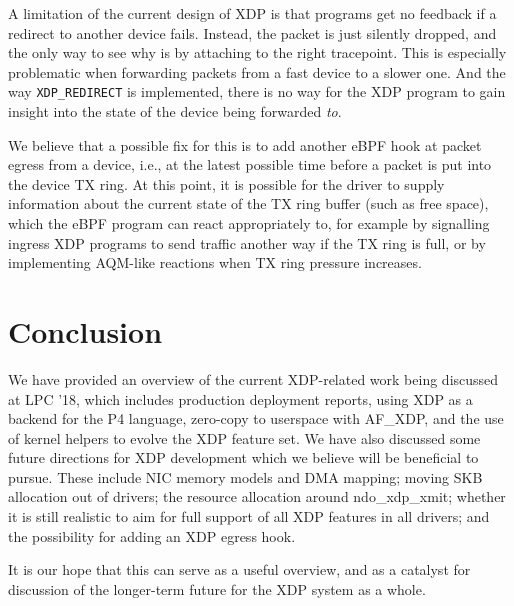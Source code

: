 \documentclass[sigconf]{acmart}
\begin{document}
A limitation of the current design of XDP is that programs get no feedback if a
redirect to another device fails. Instead, the packet is just silently dropped,
and the only way to see why is by attaching to the right tracepoint. This is
especially problematic when forwarding packets from a fast device to a slower
one. And the way \texttt{XDP\_REDIRECT} is implemented, there is no way for the
XDP program to gain insight into the state of the device being forwarded
\emph{to}.

We believe that a possible fix for this is to add another eBPF hook at packet
egress from a device, i.e., at the latest possible time before a packet is put
into the device TX ring. At this point, it is possible for the driver to supply
information about the current state of the TX ring buffer (such as free space),
which the eBPF program can react appropriately to, for example by signalling
ingress XDP programs to send traffic another way if the TX ring is full, or by
implementing AQM-like reactions when TX ring pressure increases.

\section{Conclusion}
\label{sec:conclusion}

We have provided an overview of the current XDP-related work being discussed at
LPC '18, which includes production deployment reports, using XDP as a backend
for the P4 language, zero-copy to userspace with AF\_XDP, and the use of kernel
helpers to evolve the XDP feature set. We have also discussed some future
directions for XDP development which we believe will be beneficial to pursue.
These include NIC memory models and DMA mapping; moving SKB allocation out of
drivers; the resource allocation around ndo\_xdp\_xmit; whether it is still
realistic to aim for full support of all XDP features in all drivers; and the
possibility for adding an XDP egress hook.

It is our hope that this can serve as a useful overview, and as a catalyst for
discussion of the longer-term future for the XDP system as a whole.




\end{document}
